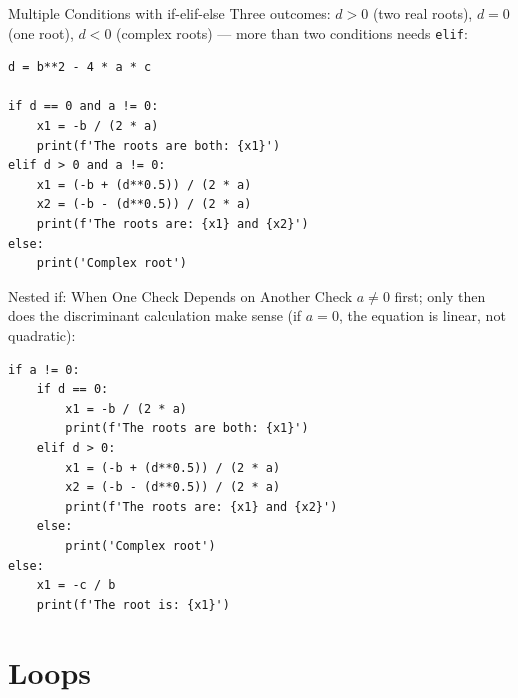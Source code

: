 \documentclass[9pt,aspectratio=169,xcolor=table]{beamer}
\begin{document}
\begin{frame}[fragile]{Multiple Conditions with if-elif-else}
    \leavevmode
    Three outcomes: $d>0$ (two real roots), $d=0$ (one root), $d<0$
    (complex roots) --- \alert{more than two conditions needs} \texttt{elif}:

\begin{lstlisting}
d = b**2 - 4 * a * c

if d == 0 and a != 0:
    x1 = -b / (2 * a)
    print(f'The roots are both: {x1}')
elif d > 0 and a != 0:
    x1 = (-b + (d**0.5)) / (2 * a)
    x2 = (-b - (d**0.5)) / (2 * a)
    print(f'The roots are: {x1} and {x2}')
else:
    print('Complex root')
\end{lstlisting}
\end{frame}

\begin{frame}[fragile]{Nested if: When One Check Depends on Another}
    \leavevmode
    Check $a \neq 0$ \alert{first}; only then does the discriminant
    calculation make sense (if $a=0$, the equation is linear, not
    quadratic):

\begin{lstlisting}
if a != 0:
    if d == 0:
        x1 = -b / (2 * a)
        print(f'The roots are both: {x1}')
    elif d > 0:
        x1 = (-b + (d**0.5)) / (2 * a)
        x2 = (-b - (d**0.5)) / (2 * a)
        print(f'The roots are: {x1} and {x2}')
    else:
        print('Complex root')
else:
    x1 = -c / b
    print(f'The root is: {x1}')
\end{lstlisting}
\end{frame}

\section{Loops}
\end{document}
